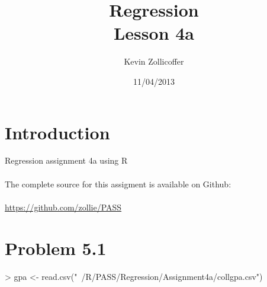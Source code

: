 \documentclass{article}
\author{Kevin Zollicoffer}
\title{Regression\\Lesson 4a}
\date{11/04/2013}
\begin{document}
\maketitle


\section*{Introduction}
Regression assignment 4a using R
\\
\\
The complete source for this assigment is available on Github:
\\
\\
\url{https://github.com/zollie/PASS}

\section*{Problem 5.1}
\begin{Schunk}
\begin{Sinput}
> gpa <- read.csv("~/R/PASS/Regression/Assignment4a/collgpa.csv")
\end{Sinput}
\end{Schunk}
\end{document}
